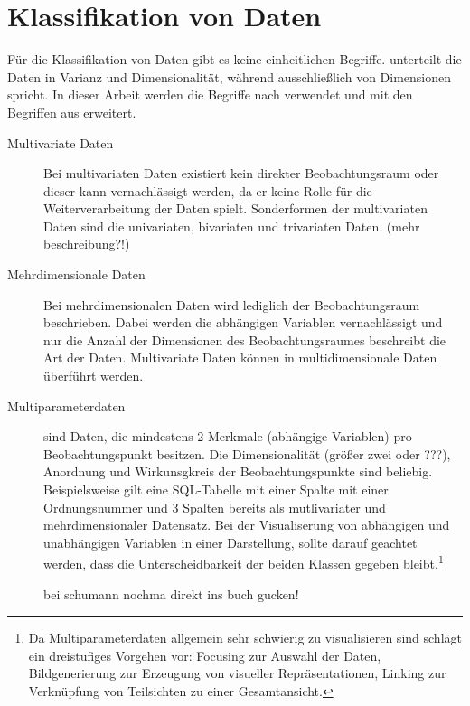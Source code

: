 \documentclass[a4paper, 12pt, DIVcalc, onepage, pdftex, headsepline, footsepline]{scrreprt}
\begin{document}
\section{Klassifikation von Daten}
\label{sec:KlassifikationDaten}
Für die Klassifikation von Daten gibt es keine einheitlichen Begriffe. \citep{Schumann} unterteilt die Daten
in Varianz und Dimensionalität, während \citep{Preim} ausschließlich von Dimensionen spricht.
In dieser Arbeit werden die Begriffe nach \citep{Schumann} verwendet und mit den Begriffen aus \citep{Preim}
erweitert.
\begin{description}
\item[Multivariate Daten]
Bei multivariaten Daten existiert kein direkter Beobachtungsraum oder dieser kann vernachlässigt werden, da er
keine Rolle für die Weiterverarbeitung der Daten spielt. Sonderformen der multivariaten Daten sind die univariaten,
bivariaten und trivariaten Daten. (mehr beschreibung?!)
\item[Mehrdimensionale Daten]
Bei mehrdimensionalen Daten wird lediglich der Beobachtungsraum beschrieben. Dabei werden die abhängigen Variablen
vernachlässigt und nur die Anzahl der Dimensionen des Beobachtungsraumes beschreibt die Art der Daten.
Multivariate Daten können in multidimensionale Daten überführt werden.
\item[Multiparameterdaten]
sind Daten, die mindestens 2 Merkmale (abhängige Variablen) pro Beobachtungspunkt besitzen. Die Dimensionalität
(größer zwei oder ???), Anordnung und Wirkunsgkreis der Beobachtungspunkte sind beliebig.
Beispielsweise gilt eine SQL-Tabelle mit einer Spalte mit einer Ordnungsnummer und 3 Spalten bereits
als mutlivariater und mehrdimensionaler Datensatz.
Bei der Visualiserung von abhängigen und unabhängigen Variablen in einer Darstellung, sollte darauf geachtet
werden, dass die Unterscheidbarkeit der beiden Klassen gegeben bleibt.\footnote{Da Multiparameterdaten
allgemein sehr schwierig zu visualisieren sind schlägt \citep{Schumann} ein dreistufiges Vorgehen vor:
Focusing zur Auswahl der Daten, Bildgenerierung zur Erzeugung von visueller Repräsentationen, Linking
zur Verknüpfung von Teilsichten zu einer Gesamtansicht.}

bei schumann nochma direkt ins buch gucken!


\end{description}
\end{document}
